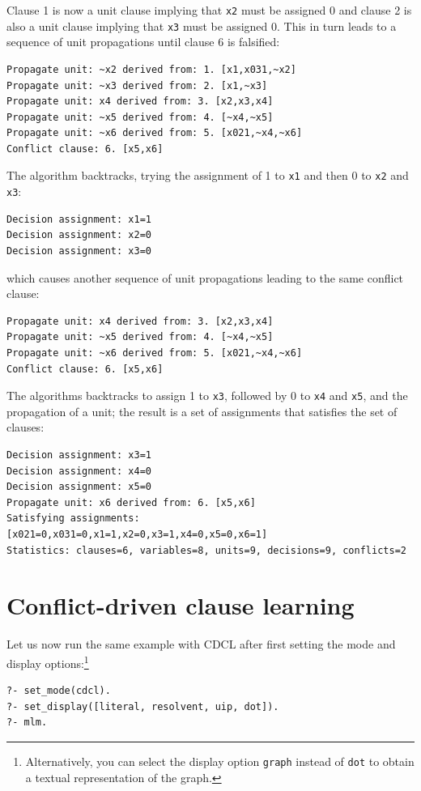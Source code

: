 \documentclass[11pt]{report}
\newcommand*{\p}[1]{\textup{\texttt{#1}}}
\begin{document}
Clause 1 is now a unit clause implying that \p{x2} must be assigned 0
and clause 2 is also a unit clause implying that \p{x3} must be assigned
0. This in turn leads to a sequence of unit propagations until clause 6
is falsified:

\begin{verbatim}
Propagate unit: ~x2 derived from: 1. [x1,x031,~x2]
Propagate unit: ~x3 derived from: 2. [x1,~x3]
Propagate unit: x4 derived from: 3. [x2,x3,x4]
Propagate unit: ~x5 derived from: 4. [~x4,~x5]
Propagate unit: ~x6 derived from: 5. [x021,~x4,~x6]
Conflict clause: 6. [x5,x6]
\end{verbatim}

The algorithm backtracks, trying the assignment of 1 to \p{x1} and then
0 to \p{x2} and \p{x3}:
\begin{verbatim}
Decision assignment: x1=1
Decision assignment: x2=0
Decision assignment: x3=0
\end{verbatim}
which causes another sequence of unit propagations leading to the same
conflict clause:
\begin{verbatim}
Propagate unit: x4 derived from: 3. [x2,x3,x4]
Propagate unit: ~x5 derived from: 4. [~x4,~x5]
Propagate unit: ~x6 derived from: 5. [x021,~x4,~x6]
Conflict clause: 6. [x5,x6]
\end{verbatim}

The algorithms backtracks to assign 1 to \p{x3}, followed by 0 to \p{x4}
and \p{x5}, and the propagation of a unit; the result is a set of
assignments that satisfies the set of clauses:
\begin{verbatim}
Decision assignment: x3=1
Decision assignment: x4=0
Decision assignment: x5=0
Propagate unit: x6 derived from: 6. [x5,x6]
Satisfying assignments:
[x021=0,x031=0,x1=1,x2=0,x3=1,x4=0,x5=0,x6=1]
Statistics: clauses=6, variables=8, units=9, decisions=9, conflicts=2
\end{verbatim}


\section{Conflict-driven clause learning}

Let us now run the same example with CDCL after first setting
the mode and display options:\footnote{Alternatively, you
can select the display option \p{graph} instead of \p{dot} to obtain a
textual representation of the graph.}
\begin{verbatim}
?- set_mode(cdcl).
?- set_display([literal, resolvent, uip, dot]).
?- mlm.
\end{verbatim}
\end{document}
